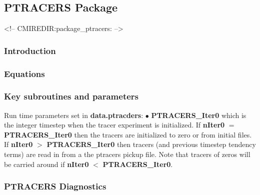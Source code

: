 \subsection {PTRACERS Package} 
\label{sec:pkg:ptracers}
\begin{rawhtml}
<!-- CMIREDIR:package_ptracers: -->
\end{rawhtml}

\subsubsection {Introduction}

\subsubsection {Equations}

\subsubsection {Key subroutines and parameters}

Run time parameters  set in {\bf data.ptracders}:
$\bullet$ {\bf PTRACERS\_Iter0} which is the integer timestep when the tracer experiment
 is initialized. If {\bf nIter0} $=$ {\bf PTRACERS\_Iter0} then the tracers
 are initialized to zero or from initial files. If {\bf nIter0} $>$
 {\bf PTRACERS\_Iter0} then tracers (and previous timestep tendency terms)
  are read in from a the ptracers pickup file. Note that tracers
  of zeros will be carried around if {\bf nIter0} $<$ {\bf PTRACERS\_Iter0}.
\\


\subsubsection{PTRACERS Diagnostics}
\label{sec:pkg:ptracers:diagnostics}

